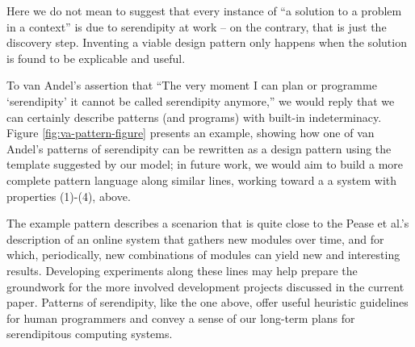 Here we do not mean to suggest that every instance of ``a solution to a
problem in a context'' is due to serendipity at work -- on the
contrary, that is just the discovery step.  Inventing a viable design pattern
only happens when the solution is found to be explicable and useful.

To van Andel's assertion that ``The very moment I can plan or
programme `serendipity' it cannot be called serendipity anymore,'' we
would reply that we can certainly describe patterns (and programs)
with built-in indeterminacy.  Figure \ref{fig:va-pattern-figure}
presents an example, showing how one of van Andel's patterns of
serendipity can be rewritten as a design pattern using the template
suggested by our model; in future work, we would aim to build a more
complete pattern language along similar lines, working toward a a
system with properties (1)-(4), above.

The example pattern describes a scenarion that is quite close to the
Pease et al.'s \citeyear{pease2013discussion} description of an online
system that gathers new modules over time, and for which,
periodically, new combinations of modules can yield new and
interesting results.
%
Developing experiments along these lines may help prepare the
groundwork for the more involved development projects discussed in the
current paper.
%
Patterns of serendipity, like the one above, offer useful heuristic
guidelines for human programmers and convey a sense of our long-term
plans for serendipitous computing systems.

